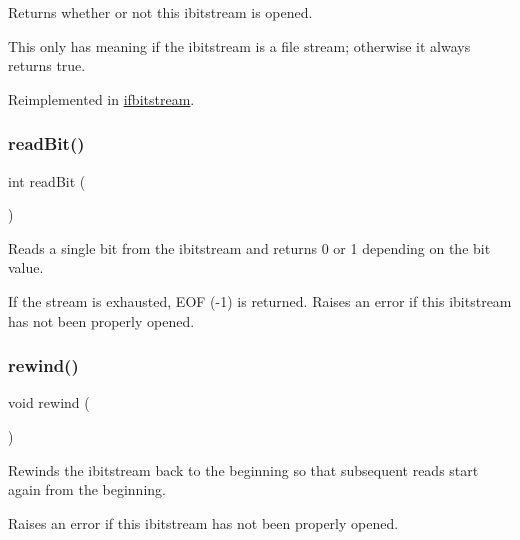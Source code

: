 Returns whether or not this ibitstream is opened. 

This only has meaning if the ibitstream is a file stream; otherwise it always returns true. 

Reimplemented in \mbox{\hyperlink{classifbitstream_a2f57f54d8c03b615bb31eee091d8a88a}{ifbitstream}}.

\mbox{\label{classibitstream_aa8c615fa7957fb0232a0873dadbd39e8}} 
\subsubsection{\texorpdfstring{read\+Bit()}{readBit()}}
{\footnotesize\ttfamily int read\+Bit (\begin{DoxyParamCaption}{ }\end{DoxyParamCaption})\hspace{0.3cm}{\ttfamily [inherited]}}



Reads a single bit from the ibitstream and returns 0 or 1 depending on the bit value. 

If the stream is exhausted, E\+OF (-\/1) is returned. Raises an error if this ibitstream has not been properly opened. \mbox{\label{classibitstream_ab8734e666421c9fe3b6380a818c6c727}} 
\subsubsection{\texorpdfstring{rewind()}{rewind()}}
{\footnotesize\ttfamily void rewind (\begin{DoxyParamCaption}{ }\end{DoxyParamCaption})\hspace{0.3cm}{\ttfamily [inherited]}}



Rewinds the ibitstream back to the beginning so that subsequent reads start again from the beginning. 

Raises an error if this ibitstream has not been properly opened. \mbox{\label{classibitstream_ad916b4624eb09d375514964f867b475c}} 
